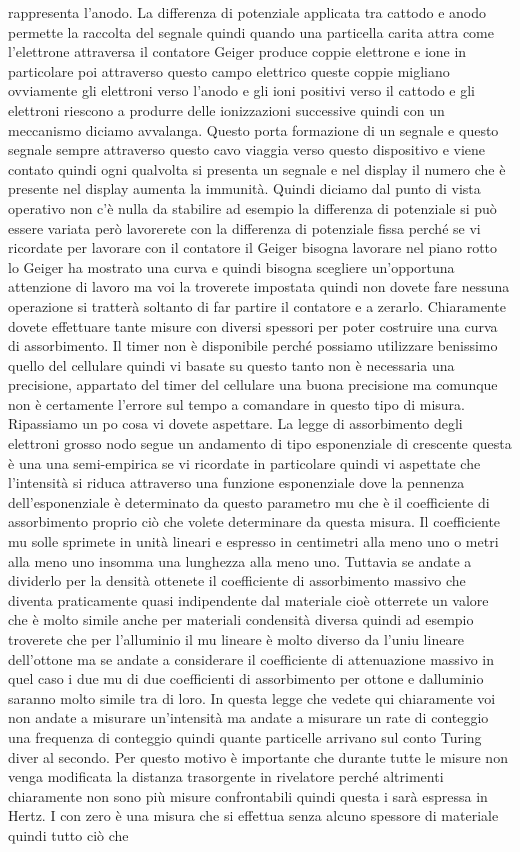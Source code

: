 rappresenta l'anodo. La differenza di potenziale applicata tra cattodo e anodo permette la raccolta del segnale quindi quando una particella carita attra come l'elettrone attraversa il contatore Geiger produce coppie elettrone e ione in particolare poi attraverso questo campo elettrico queste coppie migliano ovviamente gli elettroni verso l'anodo e gli ioni positivi verso il cattodo e gli elettroni riescono a produrre delle ionizzazioni successive quindi con un meccanismo diciamo avvalanga. Questo porta formazione di un segnale e questo segnale sempre attraverso questo cavo viaggia verso questo dispositivo e viene contato quindi ogni qualvolta si presenta un segnale e nel display il numero che è presente nel display aumenta la immunità. Quindi diciamo dal punto di vista operativo non c'è nulla da stabilire ad esempio la differenza di potenziale si può essere variata però lavorerete con la differenza di potenziale fissa perché se vi ricordate per lavorare con il contatore il Geiger bisogna lavorare nel piano rotto lo Geiger ha mostrato una curva e quindi bisogna scegliere un'opportuna attenzione di lavoro ma voi la troverete impostata quindi non dovete fare nessuna operazione si tratterà soltanto di far partire il contatore e a zerarlo. Chiaramente dovete effettuare tante misure con diversi spessori per poter costruire una curva di assorbimento. Il timer non è disponibile perché possiamo utilizzare benissimo quello del cellulare quindi vi basate su questo tanto non è necessaria una precisione, appartato del timer del cellulare una buona precisione ma comunque non è certamente l'errore sul tempo a comandare in questo tipo di misura. Ripassiamo un po cosa vi dovete aspettare. La legge di assorbimento degli elettroni grosso nodo segue un andamento di tipo esponenziale di crescente questa è una una semi-empirica se vi ricordate in particolare quindi vi aspettate che l'intensità si riduca attraverso una funzione esponenziale dove la pennenza dell'esponenziale è determinato da questo parametro mu che è il coefficiente di assorbimento proprio ciò che volete determinare da questa misura. Il coefficiente mu solle sprimete in unità lineari e espresso in centimetri alla meno uno o metri alla meno uno insomma una lunghezza alla meno uno. Tuttavia se andate a dividerlo per la densità ottenete il coefficiente di assorbimento massivo che diventa praticamente quasi indipendente dal materiale cioè otterrete un valore che è molto simile anche per materiali condensità diversa quindi ad esempio troverete che per l'alluminio il mu lineare è molto diverso da l'uniu lineare dell'ottone ma se andate a considerare il coefficiente di attenuazione massivo in quel caso i due mu di due coefficienti di assorbimento per ottone e dalluminio saranno molto simile tra di loro. In questa legge che vedete qui chiaramente voi non andate a misurare un'intensità ma andate a misurare un rate di conteggio una frequenza di conteggio quindi quante particelle arrivano sul conto Turing diver al secondo. Per questo motivo è importante che durante tutte le misure non venga modificata la distanza trasorgente in rivelatore perché altrimenti chiaramente non sono più misure confrontabili quindi questa i sarà espressa in Hertz. I con zero è una misura che si effettua senza alcuno spessore di materiale quindi tutto ciò che 